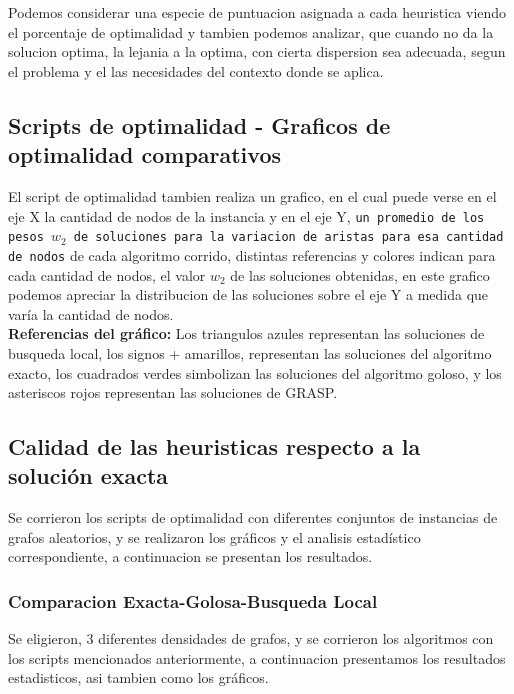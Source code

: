 Podemos considerar una especie de puntuacion asignada a cada heuristica viendo el porcentaje de optimalidad y tambien podemos analizar, que cuando no da la solucion optima, la lejania a la optima, con cierta dispersion sea adecuada, segun el problema y el las necesidades del contexto donde se aplica.

\subsection{Scripts de optimalidad - Graficos de optimalidad comparativos}
El script de optimalidad tambien realiza un grafico, en el cual puede verse en el eje X la cantidad de nodos de la instancia y en el eje Y, \texttt{un promedio de los pesos $w_2$ de soluciones para la variacion de aristas para esa cantidad de nodos} de cada algoritmo corrido, distintas referencias y colores indican para cada cantidad de nodos, el valor $w_2$ de las soluciones obtenidas, en este grafico podemos apreciar la distribucion de las soluciones sobre el eje Y a medida que var\'ia la cantidad de nodos.\\
\textbf{Referencias del gr\'afico: } Los triangulos azules representan las soluciones de busqueda local, los signos + amarillos, representan las soluciones del algoritmo exacto, los cuadrados verdes simbolizan las soluciones del algoritmo goloso, y los asteriscos rojos representan las soluciones de GRASP.

\subsection{Calidad de las heuristicas respecto a la soluci\'on exacta}
Se corrieron los scripts de optimalidad con diferentes conjuntos de instancias de grafos aleatorios, y se realizaron los gr\'aficos y el analisis estad\'istico correspondiente, a continuacion se presentan los resultados.
\subsubsection{Comparacion Exacta-Golosa-Busqueda Local}
Se eligieron, 3 diferentes densidades de grafos, y se corrieron los algoritmos con los scripts mencionados anteriormente, a continuacion presentamos los resultados estadisticos, asi tambien como los gr\'aficos.

